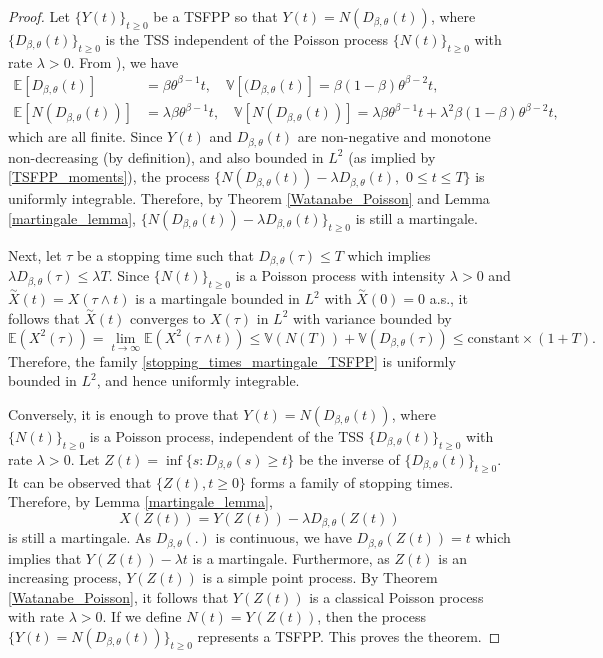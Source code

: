 \documentclass[11pt,oneside,reqno]{amsart}
\theoremstyle{definition}
\theoremstyle{remarkstyle}
\begin{document}
\begin{proof}
    Let $\{Y(t)\}_{t\ge 0}$ be a TSFPP so that $Y(t)=N(D_{\beta,\theta}(t))$, where $\{D_{\beta,\theta}(t)\}_{t\ge 0}$ is the TSS independent of the Poisson process $\{N(t)\}_{t\ge 0}$ with rate $\lambda>0$.
    From \citet{Gupta2020a}), we have
    \begin{align}\label{TSFPP_moments}
       \mathbb{E}[D_{\beta,\theta}(t)] &= \beta\theta^{\beta-1}t,\quad\mathbb{V}[(D_{\beta,\theta}(t)]=\beta(1-\beta)\theta^{\beta-2}t,~  \nonumber \\
       \mathbb{E}[N(D_{\beta,\theta}(t))]&=\lambda\beta \theta^{\beta-1}t,\quad\mathbb{V}[N(D_{\beta,\theta}(t))]=\lambda\beta\theta^{\beta-1}t+\lambda^2\beta(1-\beta)\theta^{\beta-2}t,
    \end{align}
    which are all finite. Since $Y(t)$ and $D_{\beta,\theta}(t)$ are non-negative and monotone non-decreasing (by definition), and also bounded in $L^2$ (as implied by \eqref{TSFPP_moments}), the process $\{N(D_{\beta,\theta}(t))-\lambda D_{\beta,\theta}(t),\,\,0\le t\le T\}$ is uniformly integrable. Therefore, by Theorem \ref{Watanabe_Poisson} and Lemma \ref{martingale_lemma}, $\{N(D_{\beta,\theta}(t))-\lambda D_{\beta,\theta}(t)\}_{t\ge 0}$ is still a martingale.
   
   Next, let $\tau$ be a stopping time such that $D_{\beta,\theta}(\tau)\le T$ which implies $\lambda D_{\beta,\theta}(\tau)\le \lambda T$. Since $\{N(t)\}_{t\ge 0}$ is a Poisson process with intensity $\lambda>0$ and $\overset{\sim}{X}(t)=X(\tau\wedge t)$ is a martingale bounded in $L^2$ with $\overset{\sim}{X}(0)=0$ a.s., it follows that $\overset{\sim}{X}(t)$ converges to $X(\tau)$ in $L^2$ with variance bounded by
   \begin{equation*}
       \mathbb{E}(X^2(\tau))=\lim_{t\to\infty}\mathbb{E}(X^2(\tau\wedge t))\le\mathbb{V}(N(T))+\mathbb{V}(D_{\beta,\theta}(\tau))\le \text{constant}\times (1+T).
   \end{equation*}
   Therefore, the family \eqref{stopping_times_martingale_TSFPP} is uniformly bounded in $L^2$, and hence uniformly integrable.

   Conversely, it is enough to prove that $Y(t)=N(D_{\beta,\theta}(t))$, where $\{N(t)\}_{t\ge 0}$ is a Poisson process, independent of the TSS $\{D_{\beta,\theta}(t)\}_{t\ge 0}$ with rate $\lambda>0$. Let $Z(t)=\inf\{s:D_{\beta,\theta}(s)\ge t\}$ be the inverse of $\{D_{\beta,\theta}(t)\}_{t\ge 0}$. It can be observed that $\{Z(t),t\ge 0\}$ forms a family of stopping times. Therefore, by Lemma \ref{martingale_lemma}, 
   \begin{equation*}
       X(Z(t))=Y(Z(t))-\lambda D_{\beta,\theta}(Z(t))
   \end{equation*} is still a martingale. As $D_{\beta,\theta}(.)$ is continuous, we have $D_{\beta,\theta}(Z(t))=t$ which implies that $Y(Z(t))-\lambda t$ is a martingale. Furthermore, as $Z(t)$ is an increasing process, $Y(Z(t))$ is a simple point process. By Theorem \ref{Watanabe_Poisson}, it follows that $Y(Z(t))$ is a classical Poisson process with rate $\lambda>0$. If we define $N(t)=Y(Z(t))$, then the process $\{Y(t)=N(D_{\beta,\theta}(t))\}_{t\ge 0}$ represents a TSFPP. This proves the theorem.
\end{proof}
\end{document}

